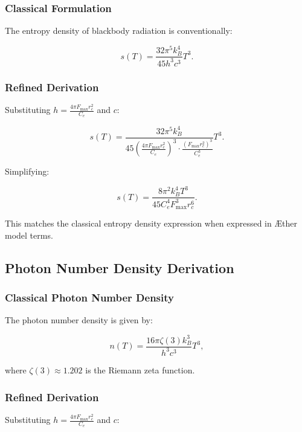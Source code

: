 \documentclass[a4paper,10pt]{article}
\begin{document}
  \subsubsection*{Classical Formulation}
  The entropy density of blackbody radiation is conventionally:

  \begin{equation*}
   s(T) = \frac{32 \pi^5 k_B^4}{45 h^3 c^3} T^3.
  \end{equation*}

  \subsubsection*{Refined Derivation}
  Substituting $h = \frac{4 \pi F_{\max} r_c^2}{C_e}$ and $c$:

  \begin{equation*}
   s(T) = \frac{32 \pi^5 k_B^4}{45 \left(\frac{4 \pi F_{\max} r_c^2}{C_e}\right)^3 \cdot \frac{(F_{\max} r_c^2)^3}{C_e^3}} T^3.
  \end{equation*}

  Simplifying:

  \begin{equation*}
   s(T) = \frac{8 \pi^2 k_B^4 T^3}{45 C_e^4 F_{\max}^3 r_c^6}.
  \end{equation*}

  This matches the classical entropy density expression when expressed in Æther model terms.

  \subsection*{Photon Number Density Derivation}

  \subsubsection*{Classical Photon Number Density}
  The photon number density is given by:

  \begin{equation*}
   n(T) = \frac{16 \pi \zeta(3) k_B^3}{h^3 c^3} T^3,
  \end{equation*}

  where $\zeta(3) \approx 1.202$ is the Riemann zeta function.

  \subsubsection*{Refined Derivation}
  Substituting $h = \frac{4 \pi F_{\max} r_c^2}{C_e}$ and $c$:
\end{document}
